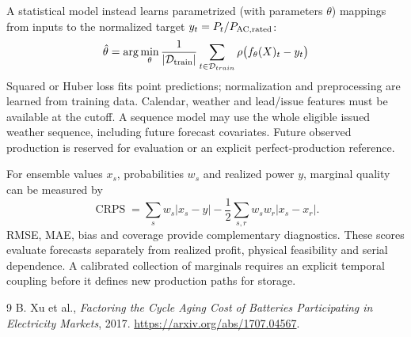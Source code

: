 \documentclass[11pt,a4paper]{article}
\begin{document}
A statistical model instead learns parametrized (with parameters $\theta$) mappings from inputs to the normalized target $y_t=P_t/P_{\rm AC,rated}$:
\begin{equation}
 \hat\theta=\arg\min_\theta\frac1{|\mathcal D_{\rm train}|}\sum_{t\in\mathcal D_{train}}
          \rho\bigl(f_\theta(X)_t-y_t\bigr)
\end{equation}
Squared or Huber loss fits point predictions; normalization and preprocessing
are learned from training data. Calendar, weather and lead/issue features
must be available at the cutoff. A sequence model may use the whole eligible
issued weather sequence, including future forecast covariates. Future observed
production is reserved for evaluation or an explicit perfect-production
reference.

For ensemble values $x_s$, probabilities $w_s$ and realized power $y$, marginal
quality can be measured by
\begin{equation}
 \operatorname{CRPS}=\sum_sw_s|x_s-y|
             -\frac12\sum_{s,r}w_sw_r|x_s-x_r|.
\end{equation}
RMSE, MAE, bias and coverage provide complementary diagnostics. These scores
evaluate forecasts separately from realized profit, physical feasibility and
serial dependence. A calibrated collection of marginals requires an explicit
temporal coupling before it defines new production paths for storage.

\begin{thebibliography}{9}
 B. Xu et al., \emph{Factoring the Cycle Aging Cost of Batteries
Participating in Electricity Markets}, 2017.
\url{https://arxiv.org/abs/1707.04567}.
\end{thebibliography}
\end{document}
